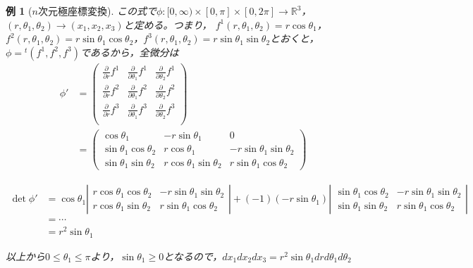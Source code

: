 \documentclass[dvipdfmx,a4j,10pt]{jsarticle}
\theoremstyle{mystyle1}
\theoremstyle{mystyle2}
\newtheorem{example}{例}
\begin{document}
\begin{example}[$n$次元極座標変換]
この式で$\phi:[0,\infty)\times[0,\pi]\times[0,2\pi]\to\mathbb{R}^3$，$(r,\theta_1,\theta_2)\to(x_1,x_2,x_3)$と定める。つまり，
$f^1(r,\theta_1,\theta_2)=r\cos\theta_1$，$f^2(r,\theta_1,\theta_2)= r\sin\theta_1\cos\theta_2 $，$f^3(r,\theta_1,\theta_2)= r\sin\theta_1\sin\theta_2$とおくと，$\phi={}^t(f^1,f^2,f^3)$であるから，全微分は
\[
    \begin{split}
	\phi'&=
	\begin{pmatrix}
	\frac{\partial}{\partial r}f^1 & \frac{\partial}{\partial \theta_1}f^1 & \frac{\partial}{\partial \theta_2}f^1 \\
	\frac{\partial}{\partial r}f^2 & \frac{\partial}{\partial \theta_1}f^2 & \frac{\partial}{\partial \theta_2}f^2 \\
	\frac{\partial}{\partial r}f^3 & \frac{\partial}{\partial \theta_1}f^3 & \frac{\partial}{\partial \theta_2}f^3 \\
	\end{pmatrix} \\
&=
\begin{pmatrix}
\cos\theta_1 & -r\sin\theta_1 & 0 \\
\sin\theta_1\cos\theta_2 & r\cos\theta_1 & -r\sin\theta_1\sin\theta_2 \\
\sin\theta_1\sin\theta_2 & r\cos\theta_1\sin\theta_2 & r\sin\theta_1\cos\theta_2
\end{pmatrix}
    \end{split}
\]

\[
\begin{split}
\det \phi' &= \cos\theta_1
\left|\begin{array}{cc}
r\cos\theta_1\cos\theta_2 & -r\sin\theta_1\sin\theta_2 \\
r\cos\theta_1\sin\theta_2 & r\sin\theta_1\cos\theta_2
\end{array}\right|
+
(-1)(-r\sin\theta_1)
\left|\begin{array}{cc}
\sin\theta_1\cos\theta_2 & -r\sin\theta_1\sin\theta_2 \\
\sin\theta_1\sin\theta_2 & r\sin\theta_1\cos\theta_2
\end{array}\right| \\
&=\cdots \\
&=r^2\sin\theta_1
\end{split}
\]

以上から$0\leq\theta_1\leq\pi$より，$\sin\theta_1\geq 0$となるので，$dx_1dx_2dx_3=r^2\sin\theta_1drd\theta_1d\theta_2$

\newpage

\end{example}
\end{document}
